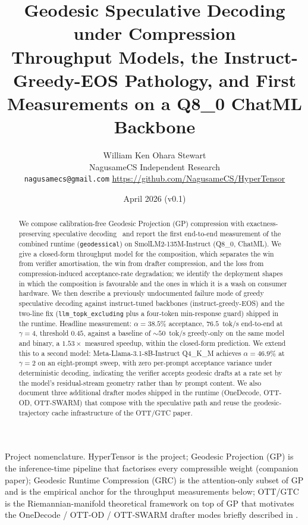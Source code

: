 \documentclass[11pt]{article}
\title{Geodesic Speculative Decoding under Compression\\[0.4em]
\large Throughput Models, the Instruct-Greedy-EOS Pathology, and First Measurements
on a Q8\_0 ChatML Backbone}
\author{William Ken Ohara Stewart\\
\small NagusameCS Independent Research\\
\small \texttt{nagusamecs@gmail.com} \quad \url{https://github.com/NagusameCS/HyperTensor}}
\date{April 2026 (v0.1)}
\begin{document}
\maketitle
\hypertensorbanner

\begin{htnote}
Project nomenclature.  HyperTensor is the project;
Geodesic Projection (GP) is the inference-time pipeline that
factorises every compressible weight (companion paper);
Geodesic Runtime Compression (GRC) is the attention-only subset of
GP and is the empirical anchor for the throughput measurements below;
OTT/GTC is the Riemannian-manifold theoretical framework on top
of GP that motivates the OneDecode / OTT-OD / OTT-SWARM drafter modes
briefly described in .
\end{htnote}

\begin{abstract}
\noindent
We compose calibration-free Geodesic Projection (GP) compression with
exactness-preserving speculative decoding~\cite{leviathan2023speculative,
chen2023speculative} and report the first end-to-end measurement of the
combined runtime (\texttt{geodessical}) on
SmolLM2-135M-Instruct (Q8\_0, ChatML).  We give a closed-form
throughput model for the composition, which separates the win from
verifier amortisation, the win from drafter compression, and the loss
from compression-induced acceptance-rate degradation; we identify the
deployment shapes in which the composition is favourable and the ones
in which it is a wash on consumer hardware.  We then describe a previously
undocumented failure mode of greedy speculative decoding against
instruct-tuned backbones (instruct-greedy-EOS) and the
two-line fix (\texttt{llm\_topk\_excluding} plus a four-token min-response
guard) shipped in the runtime.  Headline measurement: $\alpha{=}38.5\%$
acceptance, $76.5$~tok/s end-to-end at $\gamma{=}4$,
threshold $0.45$, against a baseline of $\sim 50$~tok/s greedy-only on the
same model and binary, a $1.53\times$ measured speedup, within the
closed-form prediction.  We extend this to a second model:
Meta-Llama-3.1-8B-Instruct Q4\_K\_M achieves
$\alpha{=}46.9\%$ at $\gamma{=}2$ on an eight-prompt sweep, with
zero per-prompt acceptance variance under deterministic decoding,
indicating the verifier accepts geodesic drafts at a rate set by the
model's residual-stream geometry rather than by prompt content.  We also document three additional drafter modes
shipped in the runtime (OneDecode, OTT-OD, OTT-SWARM)
that compose with the speculative path and reuse the geodesic-trajectory
cache infrastructure of the OTT/GTC paper.
\end{abstract}
\end{document}
